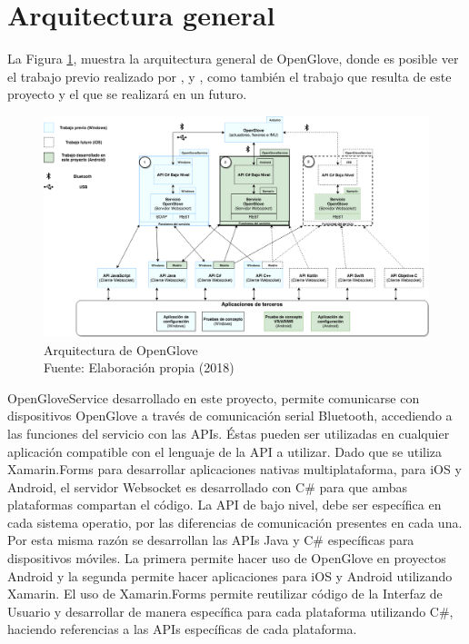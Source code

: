 \section{Arquitectura general}

La Figura \ref{fig:arquitectura-open-glove}, muestra la arquitectura general de OpenGlove, donde es posible ver el trabajo previo realizado por \cite{tesis-monsalve-rodrigo}, \cite{tesis-meneses-sebastian} y \cite{tesis-cerda-rodrigo}, como también el trabajo que resulta de este proyecto y el que se realizará en un futuro.

\begin{figure}[H]
  \begin{center} 
   	\includegraphics[width=1.0\textwidth]{images/chapter04/OpenGlove-Architecture-General.png} 
    \caption[Arquitectura de Openglove]{Arquitectura de OpenGlove \\Fuente: Elaboración propia (2018)}
    \label{fig:arquitectura-open-glove}
  \end{center}
\end{figure}

OpenGloveService  desarrollado en este proyecto, permite comunicarse con dispositivos OpenGlove a través de comunicación serial Bluetooth, accediendo a las funciones del servicio con las APIs. Éstas pueden ser utilizadas en cualquier aplicación compatible con el lenguaje de la API a utilizar. Dado que se utiliza Xamarin.Forms para desarrollar aplicaciones nativas multiplataforma, para iOS y Android, el servidor Websocket es desarrollado con C\# para que ambas plataformas compartan el código. La API de bajo nivel, debe ser específica en cada sistema operatio, por las diferencias de comunicación presentes en cada una. Por esta misma razón se desarrollan las APIs Java y C\# específicas para dispositivos móviles. La primera permite hacer uso de OpenGlove en proyectos Android y la segunda permite hacer aplicaciones para iOS y Android utilizando Xamarin. El uso de Xamarin.Forms permite reutilizar código de la Interfaz de Usuario y desarrollar de manera específica para cada plataforma utilizando C\#, haciendo referencias a las APIs específicas de cada plataforma.
